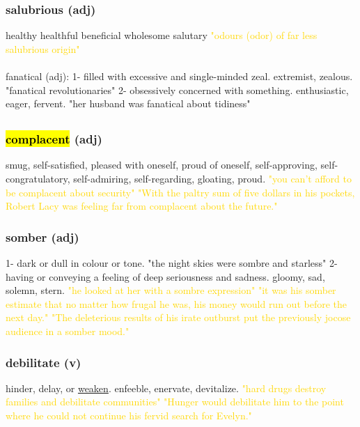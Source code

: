 \documentclass{proc}
\begin{document}
	\subsubsection{\textcolor{brickred}{salubrious} (adj)}
	healthy
	healthful
	beneficial
	wholesome
	salutary
	\textcolor{gold}{"odours (odor) of far less salubrious origin"}\\\\
	
	fanatical (adj): 1- filled with excessive and single-minded zeal. extremist, zealous.
	"fanatical revolutionaries"
	2- obsessively concerned with something. enthusiastic,
	eager,
	fervent.
	"her husband was fanatical about tidiness"
	
	\newpage
	\setcounter{section}{33}
	\setcounter{subsection}{0}
	
	
	\subsection{}
	\subsubsection{\textcolor{brickred}{\hl{complacent}} (adj)}
	smug,
	self-satisfied,
	pleased with oneself,
	proud of oneself,
	self-approving,
	self-congratulatory,
	self-admiring,
	self-regarding,
	gloating,
	proud.
	\textcolor{gold}{"you can't afford to be complacent about security" "With the paltry sum of five dollars in his pockets,  Robert Lacy was feeling far from complacent about the future."}
	
	\subsubsection{\textcolor{brickred}{somber} (adj)}
	1- dark or dull in colour or tone. "the night skies were sombre and starless"
	2- having or conveying a feeling of deep seriousness and sadness. gloomy, sad, solemn, stern.
	\textcolor{gold}{"he looked at her with a sombre expression" "it  was his somber estimate that no matter how frugal he was, his money would run out before the next day." "The deleterious results of his irate outburst put the previously jocose audience in a somber mood."}
	
	\subsubsection{\textcolor{brickred}{debilitate} (v)}
	hinder, delay, or \underline{weaken}. enfeeble,
	enervate,
	devitalize.
	\textcolor{gold}{"hard drugs destroy families and debilitate communities" "Hunger would debilitate him to the point where he could not continue his fervid search for Evelyn."}
	
\end{document}
